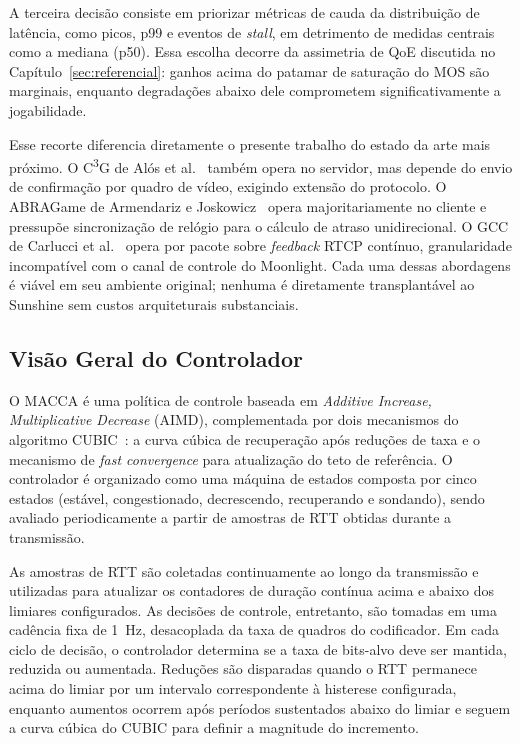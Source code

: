\documentclass[conference]{IEEEtran}
\begin{document}
A terceira decisão consiste em priorizar métricas de cauda da distribuição de latência, como picos, p99 e eventos de \emph{stall}, em detrimento de medidas centrais como a mediana (p50). Essa escolha decorre da assimetria de QoE discutida no Capítulo~\ref{sec:referencial}: ganhos acima do patamar de saturação do MOS são marginais, enquanto degradações abaixo dele comprometem significativamente a jogabilidade.

Esse recorte diferencia diretamente o presente trabalho do
estado da arte mais próximo. O C\textsuperscript{3}G de Alós et
al.~\cite{alos2019} também opera no servidor, mas depende do
envio de confirmação por quadro de vídeo, exigindo extensão do
protocolo. O ABRAGame de Armendariz e
Joskowicz~\cite{abragame} opera majoritariamente no cliente e
pressupõe sincronização de relógio para o cálculo de atraso
unidirecional. O GCC de Carlucci et al.~\cite{gcc} opera por
pacote sobre \emph{feedback} RTCP contínuo, granularidade
incompatível com o canal de controle do Moonlight. Cada uma
dessas abordagens é viável em seu ambiente original; nenhuma é
diretamente transplantável ao Sunshine sem custos arquiteturais
substanciais.

\subsection{Visão Geral do Controlador}

O MACCA é uma política de controle baseada em \emph{Additive Increase, Multiplicative Decrease} (AIMD), complementada por dois mecanismos do algoritmo CUBIC~\cite{cubic}: a curva cúbica de recuperação após reduções de taxa e o mecanismo de \emph{fast convergence} para atualização do teto de referência. O controlador é organizado como uma máquina de estados composta por cinco estados (estável, congestionado, decrescendo, recuperando e sondando), sendo avaliado periodicamente a partir de amostras de RTT obtidas durante a transmissão.

As amostras de RTT são coletadas continuamente ao longo da transmissão e utilizadas para atualizar os contadores de duração contínua acima e abaixo dos limiares configurados. As decisões de controle, entretanto, são tomadas em uma cadência fixa de 1~Hz, desacoplada da taxa de quadros do codificador. Em cada ciclo de decisão, o controlador determina se a taxa de bits-alvo deve ser mantida, reduzida ou aumentada. Reduções são disparadas quando o RTT permanece acima do limiar por um intervalo correspondente à histerese configurada, enquanto aumentos ocorrem após períodos sustentados abaixo do limiar e seguem a curva cúbica do CUBIC para definir a magnitude do incremento.
\end{document}
